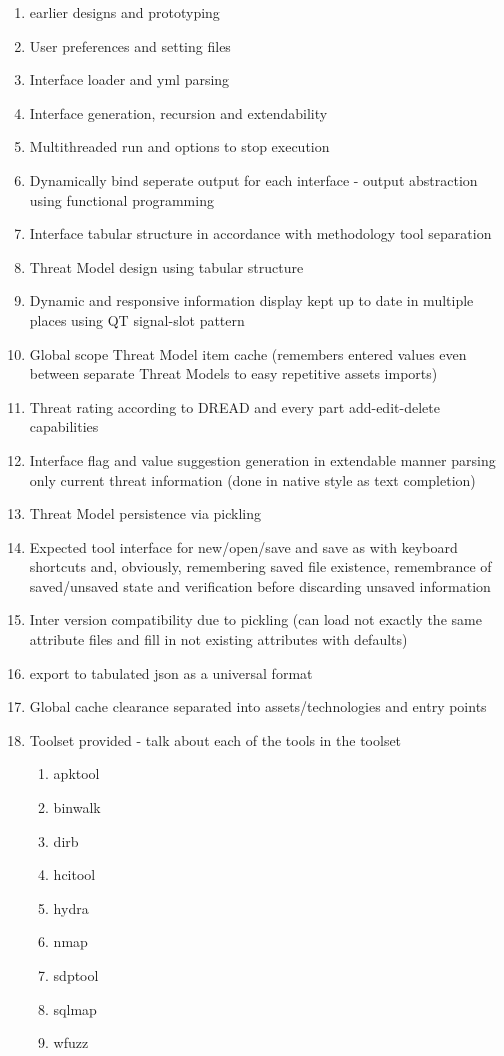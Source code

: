 \begin{enumerate}
\begin{enumerate}
		\item earlier designs and prototyping
		
		\item User preferences and setting files
		\item Interface loader and yml parsing
		\item Interface generation, recursion and extendability
		\item Multithreaded run and options to stop execution
		\item Dynamically bind seperate output for each interface - output abstraction using functional programming
		\item Interface tabular structure in accordance with methodology tool separation
		
		\item Threat Model design using tabular structure 
		\item Dynamic and responsive information display kept up to date in multiple places using QT signal-slot pattern
		\item Global scope Threat Model item cache (remembers entered values even between separate Threat Models to easy repetitive assets imports)
		\item Threat rating according to DREAD and every part add-edit-delete capabilities
		\item Interface flag and value suggestion generation in extendable manner parsing only current threat information (done in native style as text completion)
		
		\item Threat Model persistence via pickling
		\item Expected tool interface for new/open/save and save as with keyboard shortcuts and, obviously, remembering saved file existence, remembrance of saved/unsaved state and verification before discarding unsaved information
		\item Inter version compatibility due to pickling (can load not exactly the same attribute files and fill in not existing attributes with defaults)
		\item export to tabulated json as a universal format
		\item Global cache clearance separated into assets/technologies and entry points
		
		\item Toolset provided - talk about each of the tools in the toolset
		\begin{enumerate}
			\item apktool
			\item binwalk
			\item dirb
			\item hcitool
			\item hydra
			\item nmap
			\item sdptool
			\item sqlmap
			\item wfuzz
		\end{enumerate}
		

\end{enumerate}
\end{enumerate}
